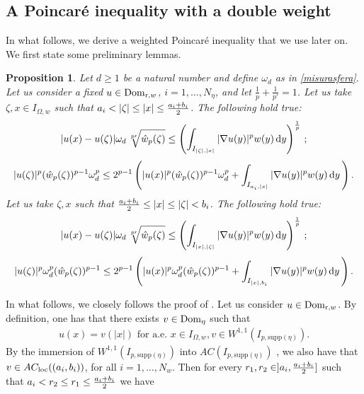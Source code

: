 \documentclass[11pt,leqno]{amsart}
\newtheorem{prop}[teo]{Proposition}
\theoremstyle{remark}
\theoremstyle{definition}
\theoremstyle{definition}
\newcommand{\wstar}{{\hat w}}
\newcommand{\supp}{\mathrm{supp}}
\def\de{{\rm d}}
\begin{document}
\subsection{A Poincar\'e inequality with a double weight}
In what follows, we derive a weighted Poincar\'e inequality that we use later on. We first state some preliminary lemmas.
\begin{prop}\label {poincarep}
Let $d\geq 1$ be a natural number and define $\omega_{d}$ as in \eqref{misurasfera}. Let us consider a fixed $u\in {\rm{Dom}}_{{\mathrm r},w}$, $i=1,\dots,N_\eta$, and let $\frac{1}{p}+\frac{1}{p\prime}=1$. Let us take $\zeta,x\in I_{\Omega,w}$ such that $a_i<\vert\zeta\vert\leq \vert x\vert\leq {{a_i+b_i}\over{2}}$. The following hold true:
\begin{equation}\label{a1}
|u(x)-u(\zeta)|\omega_{d}\,\sqrt[p\prime]{\wstar_{p}(\zeta)}
\leq \left(\int_{I_{\vert \zeta\vert,\vert x\vert}}|\nabla u(y)|^{p}w(y)\,\de y\right)^{1\over p}\,;
\end{equation}
\begin{equation}\label{a2}
|u(\zeta)|^{p}(\wstar_{p}(\zeta))^{p-1}\omega_{d}^{p}\leq 2^{p-1}\left(|u(x)|^{p}(\wstar_{p}(\zeta))^{p-1}\omega_{d}^{p}+\int_{I_{a_{i},\vert x \vert}}|\nabla u(y)|^{p}w(y)\,\de y\,\right).
\end{equation}
Let us take $\zeta,x$ such that ${{a_i+b_i}\over{2}}\leq \vert x\vert\leq \vert\zeta\vert<b_i$. The following hold true:
\begin{equation}\label{a3}
|u(x)-u(\zeta)|\omega_{d}\,\sqrt[p\prime]{\wstar_{p}(\zeta)}
\leq \left(\int_{I_{\vert x\vert,\vert \zeta\vert}}|\nabla u(y)|^{p}w(y)\,\de y\right)^{1\over {p}}\,;
\end{equation}
\begin{equation}\label{a4}
|u(\zeta)|^{p}\omega_{d}^{p}(\wstar_{p}(\zeta))^{p-1}\leq 2^{p-1}\left(|u(x)|^{p}\omega_{d}^{p}(\wstar_{p}(\zeta))^{p-1}+\int_{I_{\vert x\vert,b_i}}|\nabla u(y)|^{p}w(y)\,\de y\,\right).
\end{equation}
\end{prop}
\proof 
In what follows, we closely follows the proof of \cite[Proposition 2.8]{CCMH1}. Let us consider $u\in {\rm{Dom}}_{{\mathrm r},w}$. By definition, one has that there exists $v\in {\rm{Dom}}_{\eta}$ such that 
\begin{align*}
u(x)=v(\vert x\vert) \text{ for a.e. $x\in I_{\Omega,w}, v\in W^{1,1}(I_{p,\supp(\eta)})$.}
\end{align*}
By the immersion of $W^{1,1}(I_{p,\supp(\eta)})$ into $AC(I_{p,\supp(\eta)})$ , we also have that $v\in AC_{\rm loc}((a_i,b_i))$, for all $i=1,\ldots, N_{w}$. Then for every $r_{1}, r_{2}\in]a_i,{{a_i+b_i}\over{2}}]$ such that $a_i<r_{2}\leq r_{1}\leq {{a_i+b_i}\over{2}}$ we have
\end{document}
